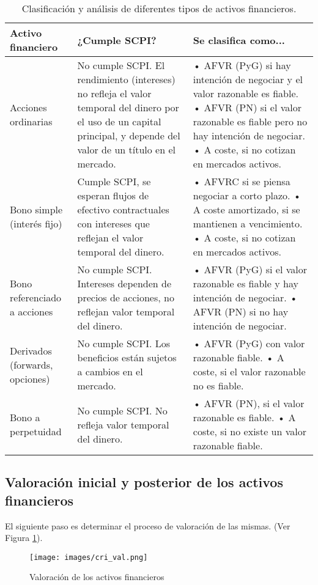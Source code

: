 \begin{table}[H]
\centering
\begin{tabularx}{\textwidth}{|X|X|X|}
\hline
\textbf{Activo financiero} & \textbf{¿Cumple SCPI?} & \textbf{Se clasifica como...} \\ \hline
Acciones ordinarias & 
No cumple SCPI. El rendimiento (intereses) no refleja el valor temporal del dinero por el uso de un capital principal, y depende del valor de un título en el mercado. & 
• AFVR (PyG) si hay intención de negociar y el valor razonable es fiable. 
• AFVR (PN) si el valor razonable es fiable pero no hay intención de negociar. 
• A coste, si no cotizan en mercados activos. \\ \hline
Bono simple (interés fijo) & 
Cumple SCPI, se esperan flujos de efectivo contractuales con intereses que reflejan el valor temporal del dinero. & 
• AFVRC si se piensa negociar a corto plazo. 
• A coste amortizado, si se mantienen a vencimiento.
• A coste, si no cotizan en mercados activos. \\ \hline
Bono referenciado a acciones & 
No cumple SCPI. Intereses dependen de precios de acciones, no reflejan valor temporal del dinero. & 
• AFVR (PyG) si el valor razonable es fiable y hay intención de negociar.
• AFVR (PN) si no hay intención de negociar. \\ \hline
Derivados (forwards, opciones) & 
No cumple SCPI. Los beneficios están sujetos a cambios en el mercado. & 
• AFVR (PyG) con valor razonable fiable.
• A coste, si el valor razonable no es fiable. \\ \hline
Bono a perpetuidad & 
No cumple SCPI. No refleja valor temporal del dinero. & 
• AFVR (PN), si el valor razonable es fiable.
• A coste, si no existe un valor razonable fiable. \\ \hline
\end{tabularx}
\caption{Clasificación y análisis de diferentes tipos de activos financieros.}
\label{tab:otrosAF}
\end{table}

\subsection{Valoración inicial y posterior de los activos financieros}

El siguiente paso es determinar el proceso de valoración de las mismas. (Ver Figura \ref{fig:Valoracion}).

\begin{figure}[H]
    \centering
    \texttt{[image: images/cri\_val.png]}
    \caption{Valoración de los activos financieros}
    \label{fig:Valoracion}
\end{figure}

